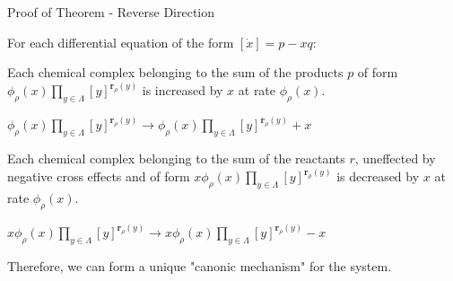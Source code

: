 \begin{frame}{Proof of Theorem - Reverse Direction}
    
        
  	For each differential equation of the form \([\dot x] = p - xq\):\newline
  	
  	Each chemical complex belonging to the sum of the products \(p\) of form \(\phi_{\rho}(x) \prod_{y \in \Lambda} [y]^{\textbf{r}_{\rho}(y)}\) is increased by \(x\) at rate \(\phi_{\rho}(x)\).\newline
    
    \(\phi_{\rho}(x) \prod_{y \in \Lambda} [y]^{\textbf{r}_{\rho}(y)} \to \phi_{\rho}(x) \prod_{y \in \Lambda} [y]^{\textbf{r}_{\rho}(y)} + x\) \newline
  	
  	Each chemical complex belonging to the sum of the reactants \(r\), uneffected by negative cross effects and of form \(x\phi_{\rho}(x) \prod_{y \in \Lambda} [y]^{\textbf{r}_{\rho}(y)}\) is decreased by \(x\) at rate \(\phi_{\rho}(x)\).\newline
    
    \(x\phi_{\rho}(x) \prod_{y \in \Lambda} [y]^{\textbf{r}_{\rho}(y)} \to x\phi_{\rho}(x) \prod_{y \in \Lambda} [y]^{\textbf{r}_{\rho}(y)} -  x\)\newline
        
        
        
    Therefore, we can form a unique "canonic mechanism" for the system.
   
\end{frame}
